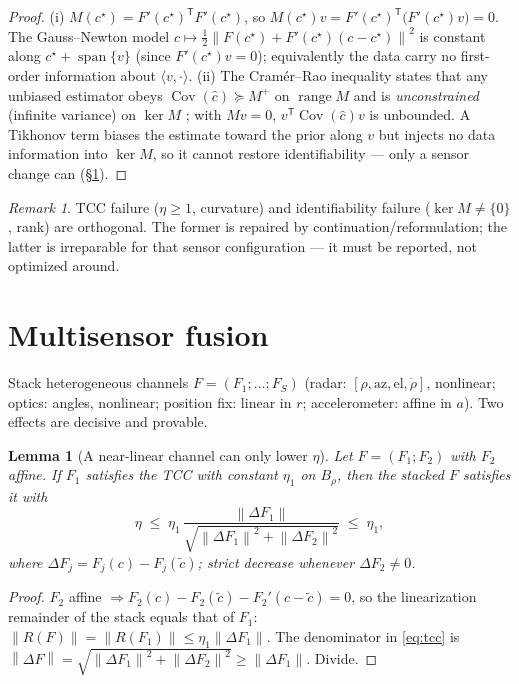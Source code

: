 \documentclass[11pt]{article}
\theoremstyle{plain}
\newtheorem{lemma}[theorem]{Lemma}
\theoremstyle{definition}
\theoremstyle{remark}
\newtheorem*{remark}{Remark}
\newcommand{\norm}[1]{\left\lVert#1\right\rVert}
\newcommand{\trc}{\mathsf{T}}
\DeclareMathOperator{\spn}{span}
\begin{document}
\begin{proof}
(i) $M(c^\star)=F'(c^\star)^{\trc}F'(c^\star)$, so
$M(c^\star)v=F'(c^\star)^{\trc}\big(F'(c^\star)v\big)=0$. The
Gauss--Newton model $c\mapsto\tfrac12\norm{F(c^\star)+F'(c^\star)(c-
c^\star)}^{2}$ is constant along $c^\star+\spn\{v\}$ (since
$F'(c^\star)v=0$); equivalently the data carry no first-order information
about $\langle v,\cdot\rangle$. (ii) The Cram\'er--Rao inequality states
that any unbiased estimator obeys
$\operatorname{Cov}(\hat c)\succeq M^{+}$ on $\operatorname{range}M$ and
is \emph{unconstrained} (infinite variance) on $\ker M$
\cite{rao1945,walter1997}; with $Mv=0$,
$v^{\trc}\operatorname{Cov}(\hat c)v$ is unbounded. A Tikhonov term
biases the estimate toward the prior along $v$ but injects no data
information into $\ker M$, so it cannot restore identifiability --- only a
sensor change can (\S\ref{sec:multi}).
\end{proof}

\begin{remark}
TCC failure ($\eta\ge1$, curvature) and identifiability failure
($\ker M\neq\{0\}$, rank) are orthogonal. The former is repaired by
continuation/reformulation; the latter is irreparable for that sensor
configuration --- it must be reported, not optimized around.
\end{remark}

\section{Multisensor fusion}\label{sec:multi}

Stack heterogeneous channels $F=(F_1;\dots;F_S)$ (radar:
$[\rho,\mathrm{az},\mathrm{el},\dot\rho]$, nonlinear; optics: angles,
nonlinear; position fix: linear in $r$; accelerometer: affine in $a$).
Two effects are decisive and provable.

\begin{lemma}[A near-linear channel can only lower $\eta$]\label{lem:stack}
Let $F=(F_1;F_2)$ with $F_2$ affine. If $F_1$ satisfies the TCC with
constant $\eta_1$ on $B_\rho$, then the stacked $F$ satisfies it with
\[
\eta\;\le\;\eta_1\,\frac{\norm{\Delta F_1}}
{\sqrt{\norm{\Delta F_1}^{2}+\norm{\Delta F_2}^{2}}}\;\le\;\eta_1,
\]
where $\Delta F_j=F_j(c)-F_j(\tilde c)$; strict decrease whenever
$\Delta F_2\neq0$.
\end{lemma}

\begin{proof}
$F_2$ affine $\Rightarrow F_2(c)-F_2(\tilde c)-F_2'(c-\tilde c)=0$, so the
linearization remainder of the stack equals that of $F_1$:
$\norm{R(F)}=\norm{R(F_1)}\le\eta_1\norm{\Delta F_1}$. The denominator in
\eqref{eq:tcc} is
$\norm{\Delta F}=\sqrt{\norm{\Delta F_1}^{2}+\norm{\Delta F_2}^{2}}
\ge\norm{\Delta F_1}$. Divide.
\end{proof}
\end{document}
